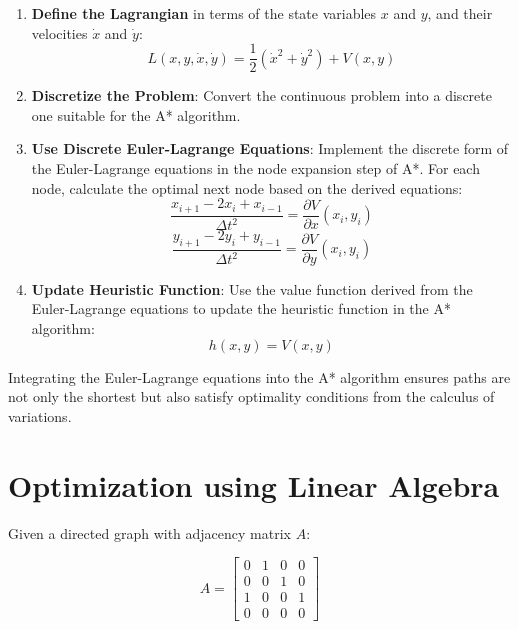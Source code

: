 \documentclass[12pt]{article}
\begin{document}
\begin{enumerate}
    \item \textbf{Define the Lagrangian} in terms of the state variables \( x \) and \( y \), and their velocities \( \dot{x} \) and \( \dot{y} \):
    \begin{equation}
        L(x, y, \dot{x}, \dot{y}) = \frac{1}{2} (\dot{x}^2 + \dot{y}^2) + V(x, y)
    \end{equation}
    \item \textbf{Discretize the Problem}: Convert the continuous problem into a discrete one suitable for the A* algorithm.
    \item \textbf{Use Discrete Euler-Lagrange Equations}: Implement the discrete form of the Euler-Lagrange equations in the node expansion step of A*. For each node, calculate the optimal next node based on the derived equations:
    \begin{equation}
        \frac{x_{i+1} - 2x_i + x_{i-1}}{\Delta t^2} = \frac{\partial V}{\partial x}(x_i, y_i)
    \end{equation}
    \begin{equation}
        \frac{y_{i+1} - 2y_i + y_{i-1}}{\Delta t^2} = \frac{\partial V}{\partial y}(x_i, y_i)
    \end{equation}
    \item \textbf{Update Heuristic Function}: Use the value function derived from the Euler-Lagrange equations to update the heuristic function in the A* algorithm:
    \begin{equation}
        h(x, y) = V(x, y)
    \end{equation}
\end{enumerate}


Integrating the Euler-Lagrange equations into the A* algorithm ensures paths are not only the shortest but also satisfy optimality conditions from the calculus of variations. 

\newpage
\newpage

\section{Optimization using Linear Algebra}




Given a directed graph with adjacency matrix \( A \):

\[
A = \begin{bmatrix}
0 & 1 & 0 & 0 \\
0 & 0 & 1 & 0 \\
1 & 0 & 0 & 1 \\
0 & 0 & 0 & 0
\end{bmatrix}
\]
\end{document}
